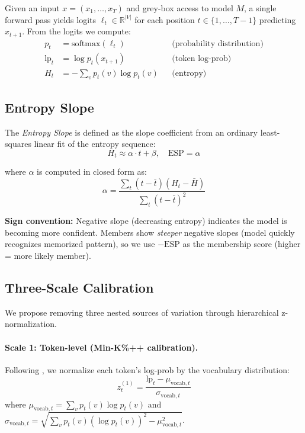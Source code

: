 \documentclass[11pt]{article}
\newcommand{\esp}{\text{ESP}}
\begin{document}
Given an input $x = (x_1, \ldots, x_T)$ and grey-box access to model $M$, a single forward pass yields logits $\ell_t \in \mathbb{R}^{|V|}$ for each position $t \in \{1, \ldots, T-1\}$ predicting $x_{t+1}$.
From the logits we compute:
\begin{align}
    p_t &= \text{softmax}(\ell_t) && \text{(probability distribution)} \\
    \text{lp}_t &= \log p_t(x_{t+1}) && \text{(token log-prob)} \\
    H_t &= -\sum_v p_t(v) \log p_t(v) && \text{(entropy)}
\end{align}

\subsection{Entropy Slope}
\label{sec:entropy_slope}

The \textit{Entropy Slope} is defined as the slope coefficient from an ordinary least-squares linear fit of the entropy sequence:
\begin{equation}
    H_t \approx \alpha \cdot t + \beta, \quad \esp = \alpha
\end{equation}

where $\alpha$ is computed in closed form as:
\begin{equation}
    \alpha = \frac{\sum_t (t - \bar{t})(H_t - \bar{H})}{\sum_t (t - \bar{t})^2}
    \label{eq:slope}
\end{equation}

\textbf{Sign convention:} Negative slope (decreasing entropy) indicates the model is becoming more confident.
Members show \textit{steeper} negative slopes (model quickly recognizes memorized pattern), so we use $-\esp$ as the membership score (higher = more likely member).

\subsection{Three-Scale Calibration}
\label{sec:calibration}

We propose removing three nested sources of variation through hierarchical z-normalization.

\paragraph{Scale 1: Token-level (Min-K\%++ calibration).}
Following \citet{zhang2024minkpp}, we normalize each token's log-prob by the vocabulary distribution:
\begin{equation}
    z^{(1)}_t = \frac{\text{lp}_t - \mu_{\text{vocab},t}}{\sigma_{\text{vocab},t}}
\end{equation}
where $\mu_{\text{vocab},t} = \sum_v p_t(v) \log p_t(v)$ and $\sigma_{\text{vocab},t} = \sqrt{\sum_v p_t(v) (\log p_t(v))^2 - \mu_{\text{vocab},t}^2}$.
\end{document}
